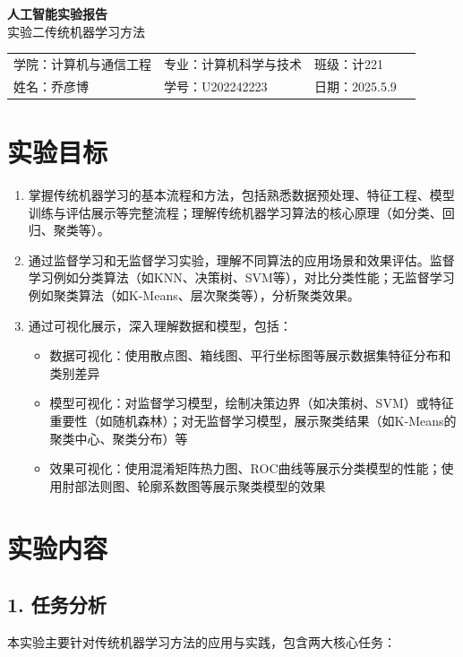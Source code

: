 \documentclass[UTF8]{ctexart}
\begin{document}
\begin{center}
  {\bfseries 人工智能实验报告}\\[1ex]
  { 实验二\quad 传统机器学习方法}
\end{center}

\renewcommand{\arraystretch}{1.6}
\begin{tabular}{p{5cm}p{5.5cm}p{3cm}p{5.5cm}}
  学院：计算机与通信工程 & 专业：计算机科学与技术 & 班级：计221\\
  姓名：乔彦博 & 学号：U202242223 & 日期：2025.5.9\\
\end{tabular}

\section*{实验目标}
\begin{enumerate}
  \item 掌握传统机器学习的基本流程和方法，包括熟悉数据预处理、特征工程、模型训练与评估展示等完整流程；理解传统机器学习算法的核心原理（如分类、回归、聚类等）。
  
  \item 通过监督学习和无监督学习实验，理解不同算法的应用场景和效果评估。监督学习例如分类算法（如KNN、决策树、SVM等），对比分类性能；无监督学习例如聚类算法（如K-Means、层次聚类等），分析聚类效果。
  
  \item 通过可视化展示，深入理解数据和模型，包括：
    \begin{itemize}
      \item 数据可视化：使用散点图、箱线图、平行坐标图等展示数据集特征分布和类别差异
      \item 模型可视化：对监督学习模型，绘制决策边界（如决策树、SVM）或特征重要性（如随机森林）；对无监督学习模型，展示聚类结果（如K-Means的聚类中心、聚类分布）等
      \item 效果可视化：使用混淆矩阵热力图、ROC曲线等展示分类模型的性能；使用肘部法则图、轮廓系数图等展示聚类模型的效果
    \end{itemize}
\end{enumerate}

\section*{实验内容}
\subsection*{1. 任务分析}
本实验主要针对传统机器学习方法的应用与实践，包含两大核心任务：
\end{document}
